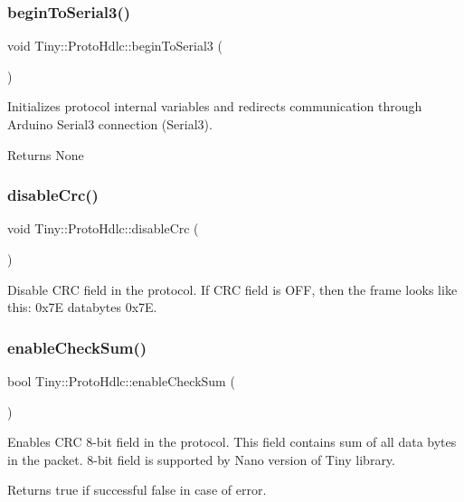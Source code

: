 \subsubsection{\texorpdfstring{begin\+To\+Serial3()}{beginToSerial3()}}
{\footnotesize\ttfamily void Tiny\+::\+Proto\+Hdlc\+::begin\+To\+Serial3 (\begin{DoxyParamCaption}{ }\end{DoxyParamCaption})\hspace{0.3cm}{\ttfamily [inline]}}

Initializes protocol internal variables and redirects communication through Arduino Serial3 connection (Serial3). \begin{DoxyReturn}{Returns}
None 
\end{DoxyReturn}
\mbox{\label{classTiny_1_1ProtoHdlc_a37506cfddcc0e1ed9a2ed697f4860b98}} 
\subsubsection{\texorpdfstring{disable\+Crc()}{disableCrc()}}
{\footnotesize\ttfamily void Tiny\+::\+Proto\+Hdlc\+::disable\+Crc (\begin{DoxyParamCaption}{ }\end{DoxyParamCaption})}

Disable C\+RC field in the protocol. If C\+RC field is O\+FF, then the frame looks like this\+: 0x7E databytes 0x7E. \mbox{\label{classTiny_1_1ProtoHdlc_a3c9ed356b3d6dd4496b1655a0704e890}} 
\subsubsection{\texorpdfstring{enable\+Check\+Sum()}{enableCheckSum()}}
{\footnotesize\ttfamily bool Tiny\+::\+Proto\+Hdlc\+::enable\+Check\+Sum (\begin{DoxyParamCaption}{ }\end{DoxyParamCaption})}

Enables C\+RC 8-\/bit field in the protocol. This field contains sum of all data bytes in the packet. 8-\/bit field is supported by Nano version of Tiny library. \begin{DoxyReturn}{Returns}
true if successful false in case of error. 
\end{DoxyReturn}
\mbox{\label{classTiny_1_1ProtoHdlc_a84e93210f940385a9408419ed605c8e5}} 
